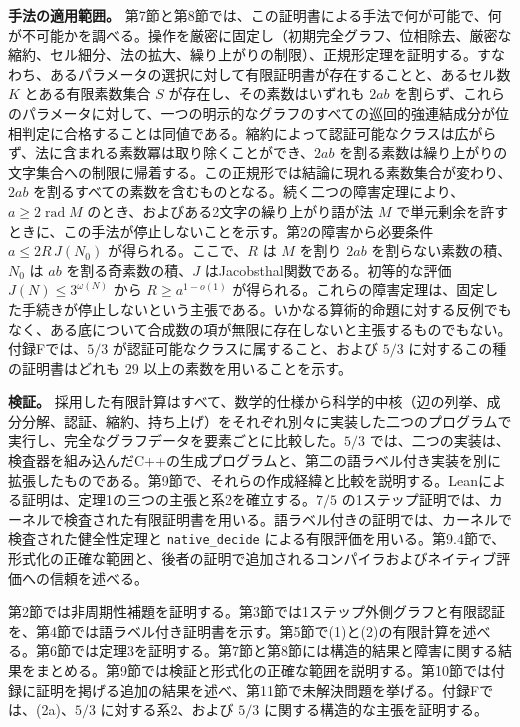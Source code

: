 \documentclass[11pt,reqno]{amsart}
\theoremstyle{definition}
\theoremstyle{definition}
\theoremstyle{remark}
\begin{document}
\textbf{手法の適用範囲。} 第7節と第8節では、この証明書による手法で何が可能で、何が不可能かを調べる。操作を厳密に固定し（初期完全グラフ、位相除去、厳密な縮約、セル細分、法の拡大、繰り上がりの制限）、正規形定理を証明する。すなわち、あるパラメータの選択に対して有限証明書が存在することと、あるセル数 \(K\) とある有限素数集合 \(S\) が存在し、その素数はいずれも \(2ab\) を割らず、これらのパラメータに対して、一つの明示的なグラフのすべての巡回的強連結成分が位相判定に合格することは同値である。縮約によって認証可能なクラスは広がらず、法に含まれる素数冪は取り除くことができ、\(2ab\) を割る素数は繰り上がりの文字集合への制限に帰着する。この正規形では結論に現れる素数集合が変わり、\(2ab\) を割るすべての素数を含むものとなる。続く二つの障害定理により、\(a\ge2\operatorname{rad}M\) のとき、およびある2文字の繰り上がり語が法 \(M\) で単元剰余を許すときに、この手法が停止しないことを示す。第2の障害から必要条件 \(a\le2R\,J(N_0)\) が得られる。ここで、\(R\) は \(M\) を割り \(2ab\) を割らない素数の積、\(N_0\) は \(ab\) を割る奇素数の積、\(J\) はJacobsthal関数である。初等的な評価 \(J(N)\le3^{\omega(N)}\) から \(R\ge a^{1-o(1)}\) が得られる。これらの障害定理は、固定した手続きが停止しないという主張である。いかなる算術的命題に対する反例でもなく、ある底について合成数の項が無限に存在しないと主張するものでもない。付録Fでは、\(5/3\) が認証可能なクラスに属すること、および \(5/3\) に対するこの種の証明書はどれも \(29\) 以上の素数を用いることを示す。

\textbf{検証。} 採用した有限計算はすべて、数学的仕様から科学的中核（辺の列挙、成分分解、認証、縮約、持ち上げ）をそれぞれ別々に実装した二つのプログラムで実行し、完全なグラフデータを要素ごとに比較した。\(5/3\) では、二つの実装は、検査器を組み込んだC++の生成プログラムと、第二の語ラベル付き実装を別に拡張したものである。第9節で、それらの作成経緯と比較を説明する。Leanによる証明は、定理1の三つの主張と系2を確立する。\(7/5\) の1ステップ証明では、カーネルで検査された有限証明書を用いる。語ラベル付きの証明では、カーネルで検査された健全性定理と \nolinkurl{native_decide} による有限評価を用いる。第9.4節で、形式化の正確な範囲と、後者の証明で追加されるコンパイラおよびネイティブ評価への信頼を述べる。

第2節では非周期性補題を証明する。第3節では1ステップ外側グラフと有限認証を、第4節では語ラベル付き証明書を示す。第5節で(1)と(2)の有限計算を述べる。第6節では定理3を証明する。第7節と第8節には構造的結果と障害に関する結果をまとめる。第9節では検証と形式化の正確な範囲を説明する。第10節では付録に証明を掲げる追加の結果を述べ、第11節で未解決問題を挙げる。付録Fでは、(2a)、\(5/3\) に対する系2、および \(5/3\) に関する構造的な主張を証明する。
\end{document}
